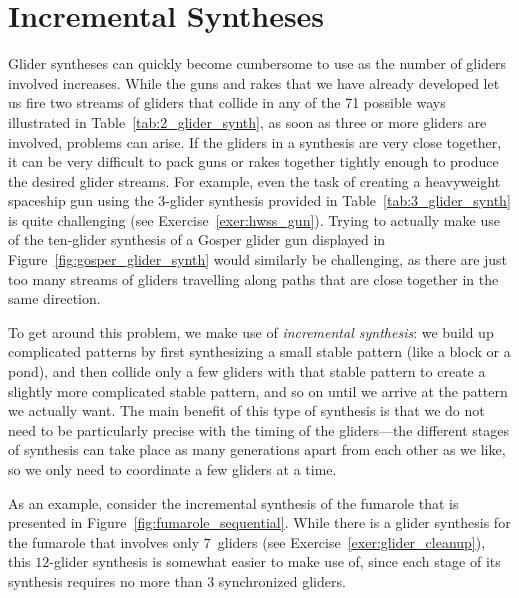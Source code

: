\section{Incremental Syntheses}\label{sec:incremental_synthesis}

Glider syntheses can quickly become cumbersome to use as the number of gliders involved increases. While the guns and rakes that we have already developed let us fire two streams of gliders that collide in any of the 71 possible ways illustrated in Table~\ref{tab:2_glider_synth}, as soon as three or more gliders are involved, problems can arise. If the gliders in a synthesis are very close together, it can be very difficult to pack guns or rakes together tightly enough to produce the desired glider streams. For example, even the task of creating a heavyweight spaceship gun using the 3-glider synthesis provided in Table~\ref{tab:3_glider_synth} is quite challenging (see Exercise~\ref{exer:hwss_gun}). Trying to actually make use of the ten-glider synthesis of a Gosper glider gun displayed in Figure~\ref{fig:gosper_glider_synth} would similarly be challenging, as there are just too many streams of gliders travelling along paths that are close together in the same direction.

To get around this problem, we make use of \emph{incremental synthesis}: we build up complicated patterns by first synthesizing a small stable pattern (like a block or a pond), and then collide only a few gliders with that stable pattern to create a slightly more complicated stable pattern, and so on until we arrive at the pattern we actually want. The main benefit of this type of synthesis is that we do not need to be particularly precise with the timing of the gliders---the different stages of synthesis can take place as many generations apart from each other as we like, so we only need to coordinate a few gliders at a time.

As an example, consider the incremental synthesis of the fumarole that is presented in Figure~\ref{fig:fumarole_sequential}. While there is a glider synthesis for the fumarole that involves only $7$~gliders (see Exercise~\ref{exer:glider_cleanup}), this $12$-glider synthesis is somewhat easier to make use of, since each stage of its synthesis requires no more than $3$ synchronized gliders.

